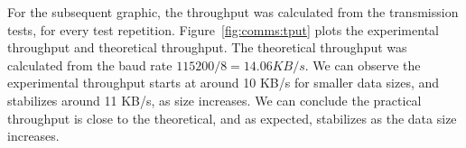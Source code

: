 %
\begin{figure}[h!]
	\centering     %
	\caption{}
\end{figure}

For the subsequent graphic, the throughput was calculated from the transmission tests, for every test repetition.
Figure~\ref{fig:comms:tput} plots the experimental throughput and theoretical throughput. The theoretical throughput was calculated from the baud rate \(115200/8 = 14.06 KB/s\).
We can observe the experimental throughput starts at around 10 KB/s for smaller data sizes, and stabilizes around 11 KB/s, as size increases.
We can conclude the practical throughput is close to the theoretical, and as expected, stabilizes as the data size increases.

